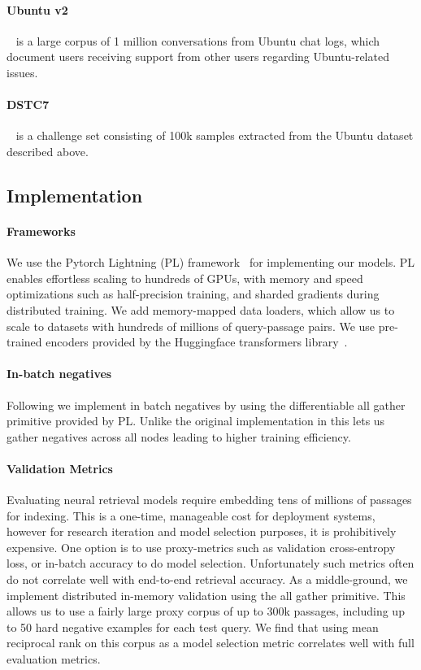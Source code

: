 \documentclass[11pt]{article}
\begin{document}
\paragraph{Ubuntu v2}~\citep{lowe2015ubuntu, arxiv18disentangle} is a large corpus of 1 million conversations from Ubuntu chat logs, which document users receiving support from other users regarding Ubuntu-related issues.
\paragraph{DSTC7}~\citep{gunasekara2019dstc7} is a challenge set consisting of 100k samples extracted from the Ubuntu dataset described above.



\subsection{Implementation}
\paragraph{Frameworks}
We use the Pytorch Lightning (PL) framework~\citep{falcon2019pytorch} for implementing our models. PL enables effortless scaling to hundreds of GPUs, with memory and speed optimizations such as half-precision training, and sharded gradients during distributed training.  We add memory-mapped data loaders, which allow us to scale to datasets with hundreds of millions of query-passage pairs.  We use pre-trained encoders provided by the Huggingface transformers library~\citep{wolf-etal-2020-transformers}.

\paragraph{In-batch negatives}
Following \cite{dpr} we implement in batch negatives by using the differentiable all gather primitive provided by PL. Unlike the original implementation in \cite{dpr} this lets us gather negatives across all nodes leading to higher training efficiency.

\paragraph{Validation Metrics}
Evaluating neural retrieval models require embedding tens of millions of passages for indexing.  This is a one-time, manageable cost for deployment systems, however for research iteration and model selection purposes, it is prohibitively expensive.  One option is to use proxy-metrics such as validation cross-entropy loss, or in-batch accuracy to do model selection.  Unfortunately such metrics often do not correlate well with end-to-end retrieval accuracy.  As a middle-ground, we implement distributed in-memory validation using the all gather primitive. This allows us to use a fairly large proxy corpus of up to 300k passages, including up to 50 hard negative examples for each test query.  We find that using mean reciprocal rank on this corpus as a model selection metric correlates well with full evaluation metrics.
\end{document}
